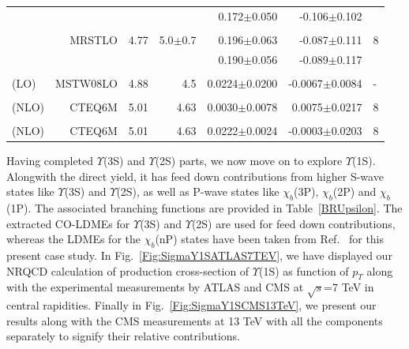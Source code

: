\documentclass[review]{elsarticle}
\begin{document}
\begin{table}
\begin{tabular*}{\textwidth}{@{\extracolsep{\fill}}lrrrrrl@{}}
    & & & & 0.172$\pm$0.050 & -0.106$\pm$0.102 & \\
    & & & & & & \\
    & MRSTLO & 4.77 & 5.0$\pm$0.7 & 0.196$\pm$0.063 & -0.087$\pm$0.111 & 8 \\
    & & & & 0.190$\pm$0.056 & -0.089$\pm$0.117 & \\
    & & & & & & \\
    \cite{Sharma:2012dy} (LO) & MSTW08LO & 4.88 & 4.5 & 0.0224$\pm$0.0200 & -0.0067$\pm$0.0084 & -  \\
    & & & & & & \\
    \cite{Gong:2013qka} (NLO) & CTEQ6M & 5.01 & 4.63 & 0.0030$\pm$0.0078 & 0.0075$\pm$0.0217 & 8 \\
    & & & & & & \\
    \cite{Feng:2015wka} (NLO) & CTEQ6M & 5.01 & 4.63 & 0.0222$\pm$0.0024 & -0.0003$\pm$0.0203 & 8 \\
    \hline
    \hline
  \end{tabular*}
  \label{LDMEsY2S}
\end{table}
\normalsize
Having completed $\Upsilon$(3S) and $\Upsilon$(2S) parts, we now move on to explore $\Upsilon$(1S). 
Alongwith the direct yield, it has feed down contributions from higher
S-wave states like $\Upsilon$(3S) and $\Upsilon$(2S), as well as P-wave states like $\chi_b$(3P), $\chi_b$(2P)
and $\chi_b$(1P). The associated branching functions are provided in Table~\ref{BRUpsilon}.
The extracted CO-LDMEs for $\Upsilon$(3S) and $\Upsilon$(2S) are used for feed down contributions,
whereas the LDMEs for the $\chi_b$(nP) states have been taken from Ref.~\cite{Sharma:2012dy,Feng:2015wka}
for this present case study.
In Fig.~\ref{Fig:SigmaY1SATLAS7TEV}, we have displayed our NRQCD calculation of production cross-section 
of $\Upsilon$(1S) as function of $p_T$ along with the experimental measurements by ATLAS and
CMS at $\sqrt{s}$=7 TeV in central rapidities.
Finally in Fig.~\ref{Fig:SigmaY1SCMS13TeV}, we present our results along with
the CMS measurements at 13 TeV with all the components separately to signify their relative
contributions. 
\end{document}
